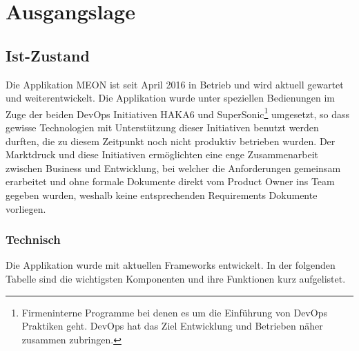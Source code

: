 \graphicspath{{./images/}}

\chapter{Ausgangslage}

\section{Ist-Zustand}

Die Applikation MEON ist seit April 2016 in Betrieb und wird aktuell gewartet und weiterentwickelt. Die Applikation wurde unter speziellen Bedienungen im Zuge der beiden DevOps Initiativen HAKA6 und SuperSonic\footnote{Firmeninterne Programme bei denen es um die Einführung von DevOps Praktiken geht. DevOps hat das Ziel Entwicklung und Betrieben näher zusammen zubringen.} umgesetzt, so dass gewisse Technologien mit Unterstützung dieser Initiativen benutzt werden durften, die zu diesem Zeitpunkt noch nicht produktiv betrieben wurden. Der Marktdruck und diese Initiativen ermöglichten eine enge Zusammenarbeit zwischen Business und Entwicklung, bei welcher die Anforderungen gemeinsam erarbeitet und ohne formale Dokumente direkt vom Product Owner ins Team gegeben wurden, weshalb keine entsprechenden Requirements Dokumente vorliegen.
\newpage
\subsection{Technisch}

Die Applikation wurde mit aktuellen Frameworks entwickelt. In der folgenden Tabelle sind die wichtigsten Komponenten und ihre Funktionen kurz aufgelistet.

